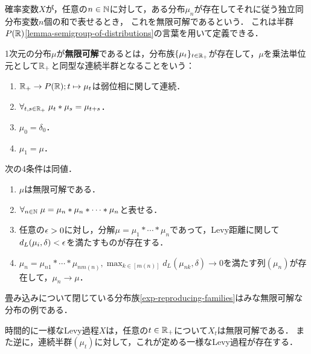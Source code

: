 \documentclass[uplatex,dvipdfmx]{jsreport}
\begin{document}
\begin{tcolorbox}[colframe=ForestGreen, colback=ForestGreen!10!white,breakable,colbacktitle=ForestGreen!40!white,coltitle=black,fonttitle=\bfseries\sffamily,
title=]
    確率変数$X$が，任意の$n\in\mathbb{N}$に対して，ある分布$\mu_n$が存在してそれに従う独立同分布変数$n$個の和で表せるとき，
    これを無限可解であるという．
    これは半群$P(\mathbb{R})$\ref{lemma-semigroup-of-distributions}の言葉を用いて定義できる．
\end{tcolorbox}

\begin{definition}
    1次元の分布$\mu$が\textbf{無限可解}であるとは，分布族$\{\mu_t\}_{t\in\mathbb{R}_+}$が存在して，$\mu$を乗法単位元として$\mathbb{R}_+$と同型な連続半群となることをいう：
    \begin{enumerate}
        \item $\mathbb{R}_+\to P(\mathbb{R});t\mapsto\mu_t$は弱位相に関して連続．
        \item $\forall_{t,s\in\mathbb{R}_+}\;\mu_t*\mu_s=\mu_{t+s}$．
        \item $\mu_0=\delta_0$．
        \item $\mu_1=\mu$．
    \end{enumerate}
\end{definition}

\begin{lemma}
    次の4条件は同値．
    \begin{enumerate}
        \item $\mu$は無限可解である．
        \item $\forall_{n\in\mathbb{N}}\;\mu=\mu_n*\mu_n*\cdots *\mu_n$と表せる．
        \item 任意の$\epsilon>0$に対し，分解$\mu=\mu_1*\cdots*\mu_n$であって，Levy距離に関して$d_L(\mu_i,\delta)<\epsilon$を満たすものが存在する．
        \item $\mu_n=\mu_{n1}*\cdots*\mu_{nm(n)},\max_{k\in[m(n)]}d_L(\mu_{nk},\delta)\to0$を満たす列$(\mu_n)$が存在して，$\mu_n\to\mu$．
    \end{enumerate}
\end{lemma}

\begin{example}
    畳み込みについて閉じている分布族\ref{exp-reproducing-families}はみな無限可解な分布の例である．
\end{example}

\begin{example}
    時間的に一様なLevy過程$X$は，任意の$t\in\mathbb{R}_+$について$X_t$は無限可解である．
    また逆に，連続半群$(\mu_t)$に対して，これが定める一様なLevy過程が存在する．
\end{example}
\end{document}

